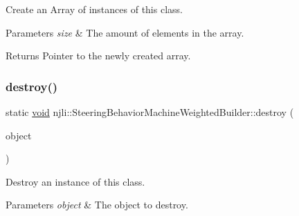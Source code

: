 Create an Array of instances of this class.


\begin{DoxyParams}{Parameters}
{\em size} & The amount of elements in the array.\\
\hline
\end{DoxyParams}
\begin{DoxyReturn}{Returns}
Pointer to the newly created array. 
\end{DoxyReturn}
\mbox{\label{classnjli_1_1_steering_behavior_machine_weighted_builder_a3681cb76419a3a9bbef5f883f3a96c56}} 
\subsubsection{\texorpdfstring{destroy()}{destroy()}}
{\footnotesize\ttfamily static \mbox{\hyperlink{_thread_8h_af1e856da2e658414cb2456cb6f7ebc66}{void}} njli\+::\+Steering\+Behavior\+Machine\+Weighted\+Builder\+::destroy (\begin{DoxyParamCaption}\item[{\mbox{\hyperlink{classnjli_1_1_steering_behavior_machine_weighted_builder}{Steering\+Behavior\+Machine\+Weighted\+Builder}} $\ast$}]{object }\end{DoxyParamCaption})\hspace{0.3cm}{\ttfamily [static]}}

Destroy an instance of this class.


\begin{DoxyParams}{Parameters}
{\em object} & The object to destroy. \\
\hline
\end{DoxyParams}
\mbox{\label{classnjli_1_1_steering_behavior_machine_weighted_builder_afd40caa65c110c3c5183e1bae7e2ffe9}} 
